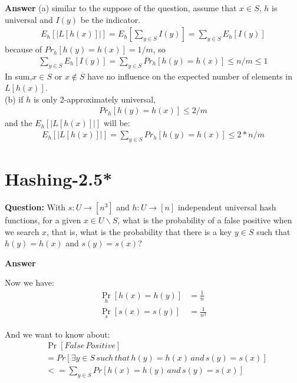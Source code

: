 \documentclass[12pt]{article}
\begin{document}
\textbf{Answer}
(a) similar to the suppose of the question, assume that $x \in S$, $h$ is universal and $I(y)$ be the indicator.
\begin{align}
    E_h[|L[h(x)]|] = E_h [\sum_{y\in S} I(y)]  = \sum_{y \in S} E_h[I(y)]
\end{align}
because of $Pr_h[h(y) = h(x)] = 1/m$, so
\begin{align}
    \sum_{y \in S} E_h[I(y)] = \sum_{y \in S} Pr_h[h(y) = h(x)] \leq n/m \leq 1
\end{align}
In sum,$ x \in S$ or $x \notin S $ have no influence on the expected number of elements in $L[h(x)]$.\\
(b) if $h$ is only 2-approximately universal, 
\begin{align}
Pr_h[h(y) = h(x)] \leq 2/m
\end{align}
and the $E_h[|L[h(x)]|] $ will be:
\begin{align}
    E_h[|L[h(x)]|] = \sum_{y \in S} Pr_h[h(y) = h(x)] \leq 2 * n / m
\end{align}
\section{Hashing-2.5*}
\textbf{Question: }
With $s: U \rightarrow [n^3]$ and $h : U \rightarrow [n]$ independent universal hash functions, for a given $x \in U \backslash S$, what is the probability of a false positive when we search $x$, that is, what is the probability that there is a key $y \in S$ such that $h(y) = h(x)$ and $s(y) = s(x)$?

\textbf{Answer}

Now we have:
\begin{equation}
\begin{aligned}
\mathop{Pr} \limits_{h} [h(x)=h(y)] &= \frac{1}{n}\\
\mathop{Pr} \limits_{s} [s(x)=s(y)] &= \frac{1}{n^3}
\end{aligned}
\end{equation}

And we want to know about:
\begin{equation}
\begin{aligned}
&\mathop{Pr}  [False \, Positive]\\
&= Pr[\exists y \in S \, such \, that \, h(y) = h(x) \, and \, s(y) = s(x)]\\
&<= \sum_{y \in S} Pr[h(x)=h(y) \, and \, s(y)=s(x)]
\end{aligned}
\end{equation}
\end{document}
